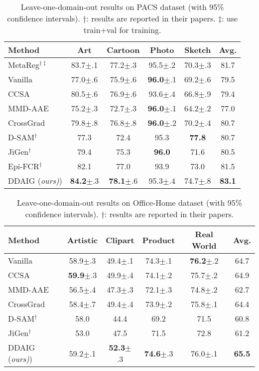 \documentclass[letterpaper]{article}
\newcommand{\tableCellHeight}{1.1}
\begin{document}
\begin{table}[t]
\setlength{\tabcolsep}{4pt}
\renewcommand{\arraystretch}{\tableCellHeight}
\centering
\footnotesize
\caption{Leave-one-domain-out results on PACS dataset (with 95\% confidence intervals). $\dagger$: results are reported in their papers. $\ddagger$: use train+val for training.}
\label{tab:resOnPACS}
\begin{tabular}{l | c c c c | c}
\hline
Method & Art & Cartoon & Photo & Sketch & Avg. \\ \hline
MetaReg$^{\dagger\ddagger}$ & 83.7$\pm$.1 & 77.2$\pm$.3 & 95.5$\pm$.2 & 70.3$\pm$.3 & 81.7 \\ \hline
Vanilla & 77.0$\pm$.6 & 75.9$\pm$.6 & \textbf{96.0}$\pm$.1 & 69.2$\pm$.6 & 79.5  \\
CCSA & 80.5$\pm$.6 & 76.9$\pm$.6 & 93.6$\pm$.4 & 66.8$\pm$.9 & 79.4 \\
MMD-AAE & 75.2$\pm$.3 & 72.7$\pm$.3 & \textbf{96.0}$\pm$.1 & 64.2$\pm$.2 & 77.0 \\
CrossGrad & 79.8$\pm$.8 & 76.8$\pm$.8 & \textbf{96.0}$\pm$.2 & 70.2$\pm$.4 & 80.7 \\
D-SAM$^\dagger$ & 77.3 & 72.4 & {95.3} & \textbf{77.8} & 80.7 \\
JiGen$^\dagger$ & 79.4 & 75.3 & \textbf{96.0} & 71.6 & 80.5 \\
Epi-FCR$^\dagger$ & {82.1} & {77.0} & 93.9 & 73.0 & {81.5} \\
DDAIG (\emph{ours)}) & \textbf{84.2}$\pm$.3 & \textbf{78.1}$\pm$.6 & {95.3}$\pm$.4 & {74.7}$\pm$.8 & \textbf{83.1} \\
\hline
\end{tabular}
\vspace{-0.1cm}
\end{table}

\begin{table}[t]
\setlength{\tabcolsep}{3pt}
\renewcommand{\arraystretch}{\tableCellHeight}
\centering
\footnotesize
\caption{Leave-one-domain-out results on Office-Home dataset (with 95\% confidence intervals). $\dagger$: results are reported in their papers.}
\label{tab:resOnOfficeHome}
\begin{tabular}{l | c c c c | c}
\hline
Method & Artistic & Clipart & Product & Real World & Avg. \\ \hline
Vanilla & 58.9$\pm$.3 & 49.4$\pm$.1 & {74.3}$\pm$.1 & \textbf{76.2}$\pm$.2 & 64.7  \\
CCSA & \textbf{59.9}$\pm$.3 & {49.9}$\pm$.4 & 74.1$\pm$.2 & 75.7$\pm$.2 & {64.9} \\
MMD-AAE & 56.5$\pm$.4 & 47.3$\pm$.3 & 72.1$\pm$.3 & 74.8$\pm$.2 & 62.7  \\
CrossGrad & 58.4$\pm$.7 & 49.4$\pm$.4 & 73.9$\pm$.2 & 75.8$\pm$.1 & 64.4 \\
D-SAM$^\dagger$ & 58.0 & 44.4 & 69.2 & 71.5 & 60.8 \\
JiGen$^\dagger$ & 53.0 & 47.5 & 71.5 & 72.8 & 61.2 \\
DDAIG (\emph{ours)}) & {59.2}$\pm$.1 & \textbf{52.3}$\pm$.3 & \textbf{74.6}$\pm$.3 & {76.0}$\pm$.1 & \textbf{65.5} \\
\hline
\end{tabular}
\vspace{-0.4cm}
\end{table}
\end{document}

